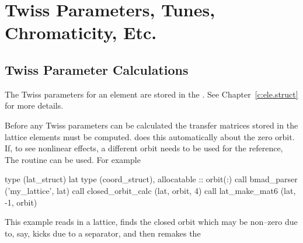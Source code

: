 \chapter{Twiss Parameters, Tunes, Chromaticity, Etc.}
\label{c:twiss}

\section{Twiss Parameter Calculations}
\label{s:twiss}

The Twiss parameters for an element are stored in the
. See Chapter~\ref{c:ele.struct} for more details.

Before any Twiss parameters can be calculated the transfer matrices
stored in the lattice elements must be computed.  does
this automatically about the zero orbit. If, to see nonlinear effects,
a different orbit needs to be used for the reference, The routine
 can be used. For example
\begin{example}
  type (lat_struct) lat
  type (coord_struct), allocatable :: orbit(:)
  call bmad_parser ('my_lattice', lat)
  call closed_orbit_calc (lat, orbit, 4)
  call lat_make_mat6 (lat, -1, orbit)
\end{example}
This example reads in a lattice, finds the closed orbit which may be
non--zero due to, say, kicks due to a separator, and then remakes the
